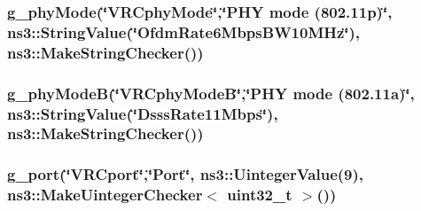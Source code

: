 \subsubsection[{\texorpdfstring{g\+\_\+phy\+Mode}{g_phyMode}}]{ g\+\_\+phy\+Mode(\char`\"{}V\+R\+Cphy\+Mode\char`\"{},\char`\"{}P\+HY mode (802.\+11p)\char`\"{}, ns3\+::\+String\+Value(\char`\"{}\+Ofdm\+Rate6\+Mbps\+B\+W10\+M\+Hz\char`\"{}), ns3\+::\+Make\+String\+Checker())\hspace{0.3cm}{\ttfamily [static]}}\hypertarget{vanet-routing-compare_8cc_adf66bd1a75ed969cfa7d1f401bc748e5}{}\label{vanet-routing-compare_8cc_adf66bd1a75ed969cfa7d1f401bc748e5}
\subsubsection[{\texorpdfstring{g\+\_\+phy\+ModeB}{g_phyModeB}}]{ g\+\_\+phy\+ModeB(\char`\"{}V\+R\+Cphy\+ModeB\char`\"{},\char`\"{}P\+HY mode (802.\+11a)\char`\"{}, ns3\+::\+String\+Value(\char`\"{}\+Dsss\+Rate11\+Mbps\char`\"{}), ns3\+::\+Make\+String\+Checker())\hspace{0.3cm}{\ttfamily [static]}}\hypertarget{vanet-routing-compare_8cc_a91584a950cd7ebb5c39c83415f12e000}{}\label{vanet-routing-compare_8cc_a91584a950cd7ebb5c39c83415f12e000}
\subsubsection[{\texorpdfstring{g\+\_\+port}{g_port}}]{ g\+\_\+port(\char`\"{}V\+R\+Cport\char`\"{},\char`\"{}Port\char`\"{}, ns3\+::\+Uinteger\+Value(9), {\bf ns3\+::\+Make\+Uinteger\+Checker}$<$ uint32\+\_\+t $>$())\hspace{0.3cm}{\ttfamily [static]}}\hypertarget{vanet-routing-compare_8cc_a1262bf81a1689770102be686a0c48b41}{}\label{vanet-routing-compare_8cc_a1262bf81a1689770102be686a0c48b41}
